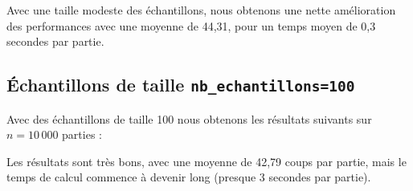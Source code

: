 Avec une taille modeste des échantillons, nous obtenons une nette amélioration des performances avec une moyenne de 44,31,  pour un temps moyen de 0,3 secondes par partie.
 
\newpage
\subsection{Échantillons de taille \texttt{nb\_echantillons=100}}
Avec des échantillons de taille 100 nous obtenons les résultats suivants sur $n=10\,000$ parties :

\begin{center}
\end{center}
 
Les résultats sont très bons, avec une moyenne de 42,79 coups par partie, mais le temps de calcul commence à devenir long (presque 3 secondes par partie). 
 
\newpage
